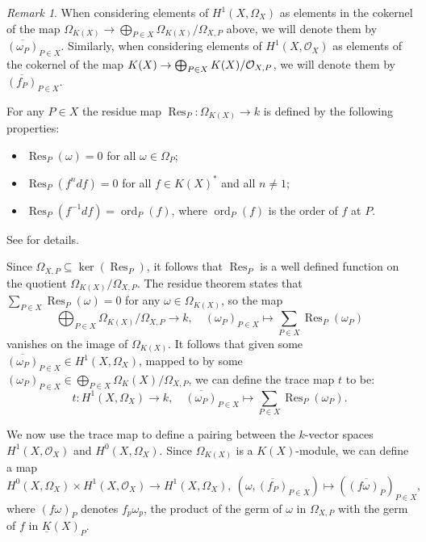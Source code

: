 \documentclass[11pt]{article} %
\theoremstyle{plain}
\theoremstyle{remark}
\newtheorem*{rem}{Remark}
\newcommand{\cO}{{\cal O}}
\newcommand{\ra}{\rightarrow}
\newcommand{\hzero}{{H^0(X,\Omega_X)}}
\newcommand{\hone}{H^1(X,\mathcal{O}_X)}
\DeclareMathOperator{\res}{Res}
\DeclareMathOperator{\ord}{ord}
\begin{document}
\begin{rem}
When considering elements of $H^1(X,\Omega_X)$ as elements in the cokernel of the map $\Omega_{K(X)} \ra \bigoplus_{P \in X}\Omega_{K(X)}/\Omega_{X,P}$ above, we will denote them by $\overline{(\omega_P)}_{P \in X}$.
Similarly, when considering elements of $\hone$ as elements of the cokernel of the map $K(X) \ra \bigoplus_{P \in X}K(X)/\cO_{X,P}$, we will denote them by $\overline{(f_P)}_{P \in X}$.
\end{rem}

For any $P\in X$ the residue map $\res_P \colon \Omega_{K(X)} \ra k$ is defined by the following properties:
\begin{itemize}
\item $\res_P(\omega) = 0$ for all $\omega \in \Omega_{P}$;
\item $\res_P(f^ndf) = 0$ for all $f \in K(X)^*$ and all $n \neq 1$;
\item $\res_P(f^{-1}df) = \ord_P(f)$, where $\ord_P(f)$ is the order of $f$ at $P$.
\end{itemize}
See \cite[Chap III, Thm. 7.14.1]{hart} for details.



Since $\Omega_{X,P} \subseteq \ker (\res_P)$, it follows that $\res_P$ is a well defined function on the quotient $\Omega_{K(X)}/\Omega_{X,P}$.
The residue theorem \cite[Chap. III, Thm. 7.14.2]{hart} states that $\sum_{P\in X} \res_P(\omega) = 0$ for any $\omega \in \Omega_{K(X)}$, so the map 
\[
\bigoplus_{P \in X} \Omega_{K(X)}/\Omega_{X,P} \ra k, \quad (\omega_P)_{P \in X} \mapsto \sum_{P\in X} \res_P(\omega_P)
\]
vanishes on the image of $\Omega_{K(X)}$.
It follows that given some $\overline{(\omega_P)}_{P \in X} \in H^1(X,\Omega_X)$, mapped to by some $(\omega_P)_{P \in X} \in \bigoplus_{P \in X} \Omega_K(X)/\Omega_{X,P}$, we can define the trace map $t$ to be:
\[
t \colon H^1\left(X, \Omega_X\right) \ra k,\quad \overline{(\omega_P)}_{P \in X}  \mapsto \sum_{P \in X} \res_P(\omega_P).
\]


We now use the trace map to define a pairing between the $k$-vector spaces $\hone$ and $\hzero$.
Since $\Omega_{K(X)}$ is a $K(X)$-module, we can define a map 
\begin{equation}\label{productmap}
\hzero \times \hone \ra H^1\left(X, \Omega_X\right), \ (\omega, \overline{(f_P)}_{P \in X}) \mapsto ( \overline {(f  \omega)_P})_{P \in X},
\end{equation}
where $(f\omega)_P$ denotes $f_p\omega_p$, the product of the germ of $\omega$ in $\Omega_{X,P}$ with the germ of $f$ in $\underline{K}(X)_{P}$.
\end{document}
